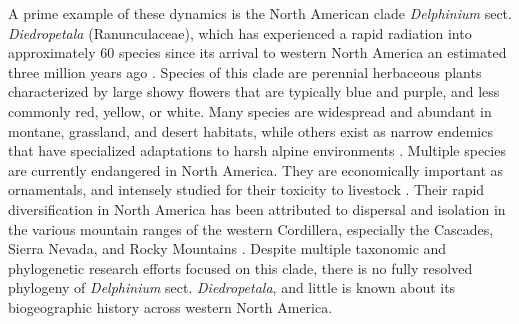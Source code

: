 \documentclass[11pt]{article}
\begin{document}


A prime example of these dynamics is the North American clade \emph{Delphinium} 
sect. \emph{Diedropetala} (Ranunculaceae), which has experienced a rapid radiation 
into approximately 60 species since its arrival to western North America an 
estimated three million years ago \citep{jabbour_phylogeny_2012}.
% 
Species of this clade are perennial herbaceous plants characterized by large 
showy flowers that are typically blue and purple, and less commonly red, yellow, 
or white. 
% 
Many species are widespread and abundant in montane, grassland, and desert habitats,
while others exist as narrow endemics that have specialized adaptations to harsh 
alpine environments \citep{warnock_taxonomic_1995}. 
% 
Multiple species are currently endangered in North America. 
They are economically important as ornamentals, and intensely studied for 
their toxicity to livestock \citep{cook_biogeographical_2009, 
cook_two_2017, gardner_taxonomic_2002, pfister_grazing_2014}.
Their rapid diversification in North America has been attributed to dispersal and 
isolation in the various mountain ranges of the western Cordillera, especially the
Cascades, Sierra Nevada, and Rocky Mountains \citep{warnock_taxonomic_1995}.
% 
Despite multiple taxonomic and phylogenetic research efforts focused on this clade,
there is no fully resolved phylogeny of \emph{Delphinium} sect. \emph{Diedropetala},
and little is known about its biogeographic history across western North America.
\end{document}
